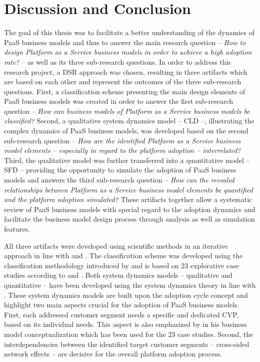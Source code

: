 \chapter{Discussion and Conclusion}\label{ch:dc}

The goal of this thesis was to facilitate a better understanding of the dynamics of \acf{PaaS} business models and thus to answer the main research question -- \textit{How to design Platform as a Service business models in order to achieve a high adoption rate?} -- as well as its three sub-research questions. In order to address this research project, a \acf{DSR} approach was chosen, resulting in three artifacts which are based on each other and represent the outcomes of the three sub-research questions. First, a classification scheme presenting the main design elements of \ac{PaaS} business models was created in order to answer the first sub-research question -- \textit{How can business models of Platform as a Service business models be classified?} Second, a qualitative system dynamics model -- \acf{CLD} --, illustrating the complex dynamics of \ac{PaaS} business models, was developed based on the second sub-research question -- \textit{How are the identified Platform as a Service business model elements -- especially in regard to the platform adoption -- interrelated?} Third, the qualitative model was further transferred into a quantitative model -- \acf{SFD} -- providing the opportunity to simulate the adoption of \ac{PaaS} business models and answers the third sub-research question -- \textit{How can the revealed relationships between Platform as a Service business model elements be quantified and the platform adoption simulated?} These artifacts together allow a systematic review of \ac{PaaS} business models with special regard to the adoption dynamics and facilitate the business model design process through analysis as well as simulation features. 

All three artifacts were developed using scientific methods in an iterative approach in line with \citet{Hevner2007} and \citet{Peffers2007}. The classification scheme was developed using the classification methodology introduced by \citet{Fettke2003} and is based on 23 explorative case studies according to \citet{Eisenhardt1989} and \citet{Yin2008}. Both system dynamics models -- qualitative and quantitative -- have been developed using the system dynamics theory in line with \citet{Sterman2000,Sterman2001}. These system dynamics models are built upon the adoption cycle concept \citep{Sterman2001} and highlight two main aspects crucial for the adoption of \ac{PaaS} business models. First, each addressed customer segment needs a specific and dedicated \acf{CVP}, based on its individual needs. This aspect is also emphasized by \citet{Johnson2008} in his business model conceptualization which has been used for the 23 case studies. Second, the interdependencies between the identified target customer segments -- cross-sided network effects -- are decisive for the overall platform adoption process.

